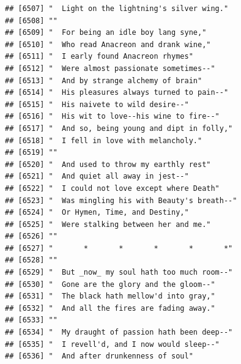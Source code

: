 \documentclass{article}\usepackage[]{graphicx}\usepackage[]{color}
\makeatletter
\newenvironment{kframe}{%
 \def\at@end@of@kframe{}%
 \ifinner\ifhmode%
  \def\at@end@of@kframe{\end{minipage}}%
  \begin{minipage}{\columnwidth}%
 \fi\fi%
 \def\FrameCommand##1{\hskip\@totalleftmargin \hskip-\fboxsep
 \colorbox{shadecolor}{##1}\hskip-\fboxsep
     \hskip-\linewidth \hskip-\@totalleftmargin \hskip\columnwidth}%
 \MakeFramed {\advance\hsize-\width
   \@totalleftmargin\z@ \linewidth\hsize
   \@setminipage}}%
 {\par\unskip\endMakeFramed%
 \at@end@of@kframe}
\newenvironment{knitrout}{}{} %
\makeatother
\begin{document}
\begin{knitrout}
\begin{kframe}
\begin{verbatim}
## [6507] "  Light on the lightning's silver wing."                                     
## [6508] ""                                                                            
## [6509] "  For being an idle boy lang syne,"                                          
## [6510] "  Who read Anacreon and drank wine,"                                         
## [6511] "  I early found Anacreon rhymes"                                             
## [6512] "  Were almost passionate sometimes--"                                        
## [6513] "  And by strange alchemy of brain"                                           
## [6514] "  His pleasures always turned to pain--"                                     
## [6515] "  His naivete to wild desire--"                                              
## [6516] "  His wit to love--his wine to fire--"                                       
## [6517] "  And so, being young and dipt in folly,"                                    
## [6518] "  I fell in love with melancholy."                                           
## [6519] ""                                                                            
## [6520] "  And used to throw my earthly rest"                                         
## [6521] "  And quiet all away in jest--"                                              
## [6522] "  I could not love except where Death"                                       
## [6523] "  Was mingling his with Beauty's breath--"                                   
## [6524] "  Or Hymen, Time, and Destiny,"                                              
## [6525] "  Were stalking between her and me."                                         
## [6526] ""                                                                            
## [6527] "       *       *       *       *       *"                                    
## [6528] ""                                                                            
## [6529] "  But _now_ my soul hath too much room--"                                    
## [6530] "  Gone are the glory and the gloom--"                                        
## [6531] "  The black hath mellow'd into gray,"                                        
## [6532] "  And all the fires are fading away."                                        
## [6533] ""                                                                            
## [6534] "  My draught of passion hath been deep--"                                    
## [6535] "  I revell'd, and I now would sleep--"                                       
## [6536] "  And after drunkenness of soul"                                             

\end{verbatim}
\end{kframe}
\end{knitrout}
\end{document}
